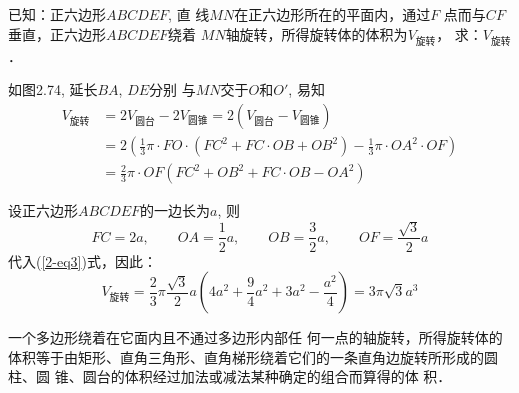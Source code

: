 \begin{example}
    已知：正六边形$ABCDEF$, 直
线$MN$在正六边形所在的平面内，通过$F$
点而与$CF$垂直，正六边形$ABCDEF$绕着
$MN$轴旋转，所得旋转体的体积为$V_{\text{旋转}}$，
求：$V_{\text{旋转}}$．
\end{example}


\begin{figure}[htp]
    \centering
{}
    \caption{}
\end{figure}

\begin{solution}
如图2.74, 延长$BA$, $DE$分别
与$MN$交于$O$和$O'$, 易知
\begin{equation}\label{2-eq3}
\begin{split}
    V_{\text{旋转}}&=2V_{\text{圆台}}-2V_{\text{圆锥}}=2\left(V_{\text{圆台}}-V_{\text{圆锥}}\right)\\
    &=2\left(\frac{1}{3}\pi\cdot FO\cdot (FC^2+FC\cdot OB+OB^2)-\frac{1}{3}\pi \cdot OA^2 \cdot OF\right)\\
    &=\frac{2}{3}\pi \cdot OF (FC^2+OB^2+FC\cdot OB-OA^2)
\end{split}
\end{equation}

设正六边形$ABCDEF$的一边长为$a$, 
则
\[FC=2a,\qquad OA=\frac{1}{2}a,\qquad OB=\frac{3}{2}a,\qquad OF=\frac{\sqrt{3}}{2}a\]
代入(\ref{2-eq3})式，因此：
\[V_{\text{旋转}}=\frac{2}{3}\pi \frac{\sqrt{3}}{2}a\left(4a^2+\frac{9}{4}a^2+3a^2-\frac{a^2}{4}\right)
=3\pi \sqrt{3}a^3\]
\end{solution}


\begin{rmk}
    一个多边形绕着在它面内且不通过多边形内部任
何一点的轴旋转，所得旋转体的体积等于由矩形、直角三角形、直角梯形绕着它们的一条直角边旋转所形成的圆柱、圆
锥、圆台的体积经过加法或减法某种确定的组合而算得的体
积．
\end{rmk}

